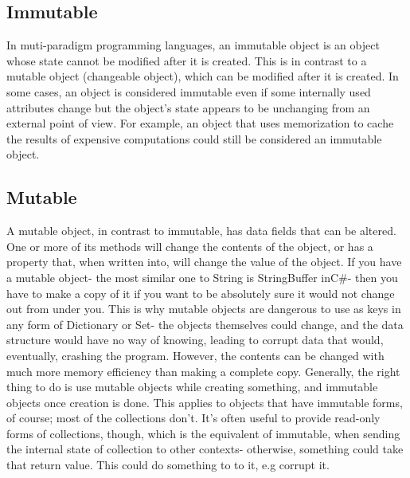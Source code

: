 \documentclass{sig-alternate}
\begin{document}
	\subsection{Immutable}
	In muti-paradigm programming languages, an immutable object is an object whose state cannot be modified after it is created. This is in contrast to a mutable object (changeable object), which can be modified after it is created. In some cases, an object is considered immutable even if some internally used attributes change but the object's state appears to be unchanging from an external point of view. For example, an object that uses memorization to cache the results of expensive computations could still be considered an immutable object.
	
	

	\subsection{Mutable}
	A mutable object, in contrast to immutable, has data fields that can be altered. One or more of its methods will change the contents of the object, or has a property that, when written into, will change the value of the object.
	If you have a mutable object- the most similar one to String is StringBuffer inC\#- then you have to make a copy of it if you want to be absolutely sure it would not change out from under you. This is why mutable objects are dangerous to use as keys in any form of Dictionary or Set- the objects themselves could change, and the data structure would have no way of knowing, leading to corrupt data that would, eventually, crashing the program. However, the contents can be changed with much more memory efficiency than making a complete copy. Generally, the right thing to do is use mutable objects while creating something, and immutable objects once creation is done. This applies to objects that have immutable forms, of course; most of the collections don't. It's often useful to provide read-only forms of collections, though, which is the equivalent of immutable, when sending the internal state of collection to other contexts- otherwise, something could take that return value. This could do something to to it, e.g corrupt it. 
	
\end{document}
